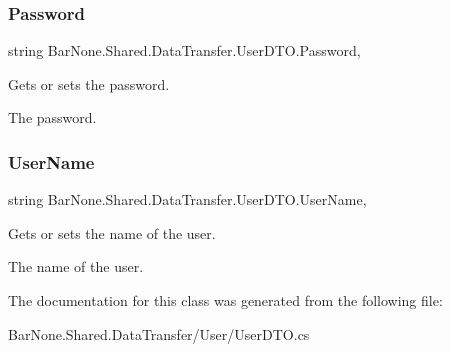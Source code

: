 \subsubsection{\texorpdfstring{Password}{Password}}
{\footnotesize\ttfamily string Bar\+None.\+Shared.\+Data\+Transfer.\+User\+D\+T\+O.\+Password\hspace{0.3cm}{\ttfamily [get]}, {\ttfamily [set]}}



Gets or sets the password. 

The password. \mbox{\label{class_bar_none_1_1_shared_1_1_data_transfer_1_1_user_d_t_o_a7775f156796d3bc16915c045d25a0ae7}} 
\subsubsection{\texorpdfstring{User\+Name}{UserName}}
{\footnotesize\ttfamily string Bar\+None.\+Shared.\+Data\+Transfer.\+User\+D\+T\+O.\+User\+Name\hspace{0.3cm}{\ttfamily [get]}, {\ttfamily [set]}}



Gets or sets the name of the user. 

The name of the user. 

The documentation for this class was generated from the following file\+:\begin{DoxyCompactItemize}
\item 
Bar\+None.\+Shared.\+Data\+Transfer/\+User/User\+D\+T\+O.\+cs\end{DoxyCompactItemize}

